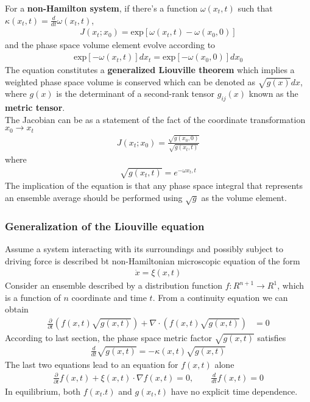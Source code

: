 \documentclass{beamer}
\begin{document}
\begin{frame}
\fontsize{9pt}{10pt}\selectfont
For a \textbf{non-Hamilton system}, if there's a function $\omega(x_t,t)$ such that $\kappa(x_t,t)=\frac{d}{dt}\omega(x_t,t)$,
\begin{align}
J(x_t;x_0)=\text{exp}[\omega(x_t,t)-\omega(x_0,0)]
\end{align}
and the phase space volume element evolve according to
\begin{align}
\text{exp}[-\omega(x_t,t)]dx_t=\text{exp}[-\omega(x_0,0)]dx_0
\end{align}
The equation constitutes a \textbf{generalized Liouville theorem} which implies a weighted phase space volume is conserved which can be denoted as $\sqrt{g(x)}dx$, where $g(x)$ is the determinant of a second-rank tensor $g_{ij}(x)$ known as the \textbf{metric tensor}.\\
The Jacobian can be as a statement of the fact of the coordinate transformation $x_0\rightarrow x_t$
\begin{align}
J(x_t;x_0)=\frac{\sqrt{g(x_0,0)}}{\sqrt{g(x_t,t)}}
\end{align}
where
\begin{align}
\sqrt{g(x_t,t)}=e^{-\omega{x_t,t}}
\end{align}
The implication of the equation is that any phase space integral that represents an ensemble average should be performed using $\sqrt{g}$ as the volume element.
\end{frame}
\begin{frame}
\frametitle{Generalization of the Liouville equation}
\fontsize{9pt}{10pt}\selectfont
Assume a system interacting with its surroundings and possibly subject to driving force is described bt non-Hamiltonian microscopic equation of the form
\begin{align}
\dot{x}=\xi(x,t)
\end{align}
Consider an ensemble described by a distribution function $f:R^{n+1}\rightarrow R^1$, which is a function of $n$ coordinate and time $t$. From a continuity equation we can obtain
\begin{align}
\frac{\partial}{\partial t}(f(x,t)\sqrt{g(x,t)})+\nabla\cdot(f(x,t)\sqrt{g(x,t)})&=0
\end{align}
According to last section, the phase space metric factor $\sqrt{g(x,t)}$ satisfies
\begin{align}
\frac{d}{dt}\sqrt{g(x,t)}=-\kappa(x,t)\sqrt{g(x,t)}
\end{align}
The last two equations lead to an equation for $f(x,t)$ alone
\begin{align}
\frac{\partial}{\partial t}f(x,t)+\xi(x,t)\cdot\nabla f(x,t)=0,\qquad
\frac{d}{dt}f(x,t)=0
\end{align}
In equilibrium, both $f(x_t.t)$ and $g(x_t,t)$ have no explicit time dependence.
\end{frame}
\end{document}
